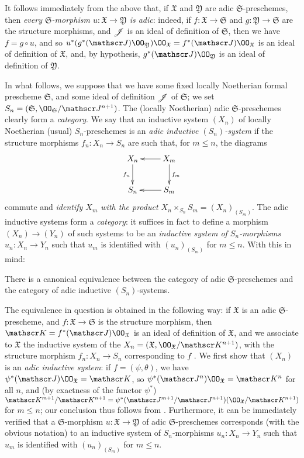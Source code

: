 It follows immediately from the above that, if $\mathfrak{X}$ and $\mathfrak{Y}$ are adic $\mathfrak{S}$-preschemes, then \emph{every $\mathfrak{S}$-morphism $u:\mathfrak{X}\to\mathfrak{Y}$ is adic}:
indeed, if $f:\mathfrak{X}\to\mathfrak{S}$ and $g:\mathfrak{Y}\to\mathfrak{S}$ are the structure morphisms, and $\mathscr{J}$ is an ideal of definition of $\mathfrak{S}$, then we have $f=g\circ u$, and so $u^*(g^*(\sh{J})\OO_\mathfrak{Y})\OO_\mathfrak{X}=f^*(\sh{J})\OO_\mathfrak{X}$ is an ideal of definition of $\mathfrak{X}$, and, by hypothesis, $g^*(\sh{J})\OO_\mathfrak{Y}$ is an ideal of definition of $\mathfrak{Y}$.

\begin{env}[10.12.2]
\label{1.10.12.2}
In what follows, we suppose that we have some fixed locally Noetherian formal prescheme $\mathfrak{S}$, and some ideal of definition $\mathscr{J}$ of $\mathfrak{S}$;
we set $S_n=(\mathfrak{S},\OO_\mathfrak{S}/\sh{J}^{n+1})$.
The (locally Noetherian) adic $\mathfrak{S}$-preschemes clearly form a \emph{category}.
We say that an inductive system $(X_n)$ of locally Noetherian (usual) $S_n$-preschemes is an \emph{adic inductive $(S_n)$-system} if the structure morphisms $f_n:X_n\to S_n$ are such that, for $m\leq n$, the diagrams
\[
  \xymatrix{
    X_n \ar[d]_{f_n}
    & X_m \ar[l] \ar[d]^{f_m}\\
    S_n
    & S_m \ar[l]
  }
\]
commute and \emph{identify $X_m$ with the product $X_n\times_{S_n}S_m=(X_n)_{(S_m)}$}.
The adic inductive systems form a \emph{category}:
it suffices in fact to define a morphism $(X_n)\to(Y_n)$ of such systems to be an \emph{inductive system of $S_n$-morphisms $u_n:X_n\to Y_n$} such that $u_m$ is identified with $(u_n)_{(S_m)}$ for $m\leq n$.
With this in mind:
\end{env}

\begin{thm}[10.12.3]
\label{1.10.12.3}
There is a canonical equivalence between the category of adic $\mathfrak{S}$-preschemes and the category of adic inductive $(S_n)$-systems.
\end{thm}

The equivalence in question is obtained in the following way:
if $\mathfrak{X}$ is an adic $\mathfrak{S}$-prescheme, and $f:\mathfrak{X}\to\mathfrak{S}$ is the structure morphism, then $\sh{K}=f^*(\sh{J})\OO_\mathfrak{X}$ is an ideal of definition of $\mathfrak{X}$, and we associate to $\mathfrak{X}$ the inductive system of the $X_n=(\mathfrak{X},\OO_\mathfrak{X}/\sh{K}^{n+1})$, with the structure morphism $f_n:X_n\to S_n$ corresponding to $f$ .
We first show that $(X_n)$ is an \emph{adic inductive system}:
if $f=(\psi,\theta)$, we have $\psi^*(\sh{J})\OO_\mathfrak{X}=\sh{K}$, so $\psi^*(\sh{J}^n)\OO_\mathfrak{X}=\sh{K}^n$ for all $n$, and (by exactness of the functor $\psi^*$) $\sh{K}^{m+1}/\sh{K}^{n+1}=\psi^*(\sh{J}^{m+1}/\sh{J}^{n+1})(\OO_\mathfrak{X}/\sh{K}^{n+1})$ for $m\leq n$;
our conclusion thus follows from .
Furthermore, it can be immediately verified that a $\mathfrak{S}$-morphism $u:\mathfrak{X}\to\mathfrak{Y}$ of adic $\mathfrak{S}$-preschemes corresponds (with the obvious notation)
to an inductive system of $S_n$-morphisms $u_n:X_n\to Y_n$ such that $u_m$ is identified with $(u_n)_{(S_m)}$ for $m\leq n$.

